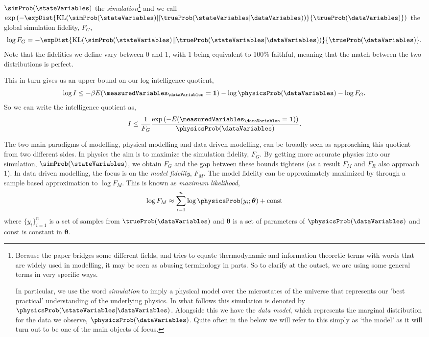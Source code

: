 $\simProb(\stateVariables)$ the \emph{simulation}\footnote{Because the paper bridges some different fields, and tries to equate
thermodynamic and information theoretic terms with words that are
widely used in modelling, it may be seen as abusing terminology in
parts. So to clarify at the outset, we are using some general terms in
very specific ways.

In particular, we use the word \emph{simulation} to imply a physical
model over the microstates of the universe that represents our 'best
practical' understanding of the underlying physics. In what follows
this simulation is denoted by
$\physicsProb(\stateVariables|\dataVariables)$. Alongside this we have
the \emph{data model}, which represents the marginal distribution for
the data we observe, $\physicsProb(\dataVariables)$. Quite often in
the below we will refer to this simply as `the model' as it will turn
out to be one of the main objects of focus.
} and we call
$\exp\left(-
\expDist{\text{KL}(\simProb(\stateVariables)||\trueProb(\stateVariables|\dataVariables))}{\trueProb(\dataVariables)}\right)$
the global simulation fidelity, $F_G$,
\[
\log F_G =
-\expDist{\text{KL}(\simProb(\stateVariables)||\trueProb(\stateVariables|\dataVariables))}{\trueProb(\dataVariables)}.
\]
Note that the fidelities we define vary between 0 and 1, with 1 being
equivalent to 100\% faithful, meaning that the match between the two
distributions is perfect.

This in turn gives us an upper bound on our log intelligence quotient,
\[
\log I \leq -\beta E(\measuredVariables_\dataVariables = \textbf{1})
-\log \physicsProb(\dataVariables) - \log F_G.
\]
So we can write the intelligence quotient as,
\[
I \leq
\frac{1}{F_G}\frac{\exp\left(-E(\measuredVariables_\dataVariables=\textbf{1})\right)}{\physicsProb(\dataVariables)}.
\]

The two main paradigms of modelling, physical modelling and data driven modelling, can be broadly seen as approaching this quotient from two different sides. In physics the aim is to maximize the simulation fidelity, $F_G$. By getting more accurate physics into our simulation, $\simProb(\stateVariables)$, we obtain $F_G$ and the gap between these bounds tightens (as a result $F_M$ and $F_R$ also approach 1). In data driven modelling, the focus is on the \emph{model fidelity}, $F_M$. The model fidelity can be approximately maximized by through a sample based approximation to $\log F_M$. This is known as \emph{maximum likelihood},
\[
\log F_M \approx \sum_{i=1}^n \log \physicsProb(y_i; \boldsymbol{\theta}) + \text{const}
\]
where $\{y_i\}_{i=1}^n$ is a set of samples from $\trueProb(\dataVariables)$ and $\boldsymbol{\theta}$ is a set of parameters of $\physicsProb(\dataVariables)$ and $\text{const}$ is constant in $\boldsymbol{\theta}$.

